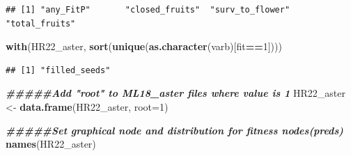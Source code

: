\documentclass[
]{article}
\newenvironment{Shaded}{\begin{snugshade}}{\end{snugshade}}
\newcommand{\AttributeTok}[1]{\textcolor[rgb]{0.13,0.29,0.53}{#1}}
\newcommand{\CommentTok}[1]{\textcolor[rgb]{0.56,0.35,0.01}{\textit{#1}}}
\newcommand{\DecValTok}[1]{\textcolor[rgb]{0.00,0.00,0.81}{#1}}
\newcommand{\DocumentationTok}[1]{\textcolor[rgb]{0.56,0.35,0.01}{\textbf{\textit{#1}}}}
\newcommand{\FunctionTok}[1]{\textcolor[rgb]{0.13,0.29,0.53}{\textbf{#1}}}
\newcommand{\NormalTok}[1]{#1}
\newcommand{\OtherTok}[1]{\textcolor[rgb]{0.56,0.35,0.01}{#1}}
\newcommand{\SpecialCharTok}[1]{\textcolor[rgb]{0.81,0.36,0.00}{\textbf{#1}}}
\newcommand{\StringTok}[1]{\textcolor[rgb]{0.31,0.60,0.02}{#1}}
\begin{document}
\begin{Shaded}
\end{Shaded}

\begin{verbatim}
## [1] "any_FitP"       "closed_fruits"  "surv_to_flower" "total_fruits"
\end{verbatim}

\begin{Shaded}
\begin{Highlighting}[]
\FunctionTok{with}\NormalTok{(HR22\_aster, }\FunctionTok{sort}\NormalTok{(}\FunctionTok{unique}\NormalTok{(}\FunctionTok{as.character}\NormalTok{(varb)[fit}\SpecialCharTok{==}\DecValTok{1}\NormalTok{])))}
\end{Highlighting}
\end{Shaded}

\begin{verbatim}
## [1] "filled_seeds"
\end{verbatim}

\begin{Shaded}
\begin{Highlighting}[]
\DocumentationTok{\#\#\#\#\#Add "root" to ML18\_aster files where value is 1 }
\NormalTok{HR22\_aster }\OtherTok{\textless{}{-}} \FunctionTok{data.frame}\NormalTok{(HR22\_aster, }\AttributeTok{root=}\DecValTok{1}\NormalTok{)}

\DocumentationTok{\#\#\#\#\#Set graphical node and distribution for fitness nodes(preds) }
\FunctionTok{names}\NormalTok{(HR22\_aster)}
\end{Highlighting}
\end{Shaded}
\end{document}
